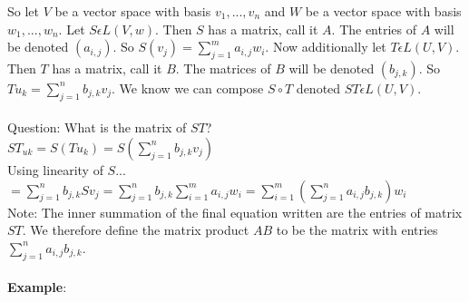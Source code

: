\documentclass{article}
\begin{document}
So let $V$ be a vector space with basis $v_1,..., v_n$ and $W$ be a vector space with basis $w_1,..., w_n$. Let $S \epsilon L(V,w)$. Then $S$ has a matrix, call it $A$. The entries of $A$ will be denoted $(a_{i,j})$. So $S(v_j) = \sum_{j=1}^m a_{i,j} w_i$. Now additionally let $T \epsilon L(U,V)$. Then $T$ has a matrix, call it $B$. The matrices of $B$ will be denoted $(b_{j,k})$. So $Tu_k = \sum_{j=1}^n b_{j,k} v_j$. We know we can compose $S \circ T$ denoted $ST \epsilon L(U,V)$. \\\\
Question: What is the matrix of $ST$?\\
$ST_{uk} = S(Tu_k) = S(\sum_{j=1}^n b_{j,k}v_j)$\\
Using linearity of $S$... \\
$=\sum_{j=1}^n b_{j,k}Sv_j = \sum_{j=1}^n b_{j,k} \sum_{i=1}^m a_{i,j}w_i = \sum_{i=1}^m (\sum_{j=1}^n a_{i,j}b_{j,k}) w_i$\\
Note: The inner summation of the final equation written are the entries of matrix $ST$. We therefore define the matrix product $AB$ to be the matrix with entries $\sum_{j=1}^n a_{i,j}b_{j,k}$.\\\\
\textbf{Example}: 
\end{document}
